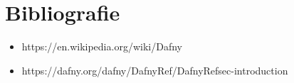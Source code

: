 \chapter*{Bibliografie} 

\begin{itemize}
    \item https://en.wikipedia.org/wiki/Dafny
    \item https://dafny.org/dafny/DafnyRef/DafnyRef{\texthash}sec-introduction
\end{itemize}